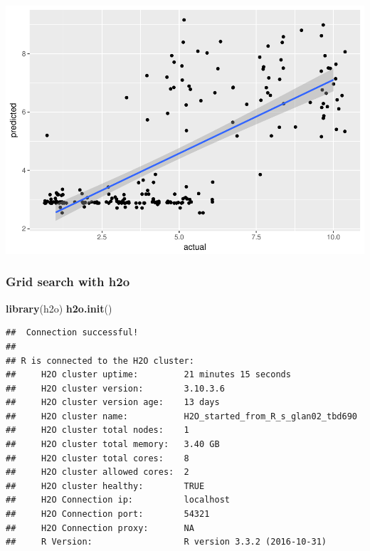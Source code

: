 \documentclass[]{article}
\newenvironment{Shaded}{\begin{snugshade}}{\end{snugshade}}
\newcommand{\KeywordTok}[1]{\textcolor[rgb]{0.13,0.29,0.53}{\textbf{{#1}}}}
\newcommand{\DataTypeTok}[1]{\textcolor[rgb]{0.13,0.29,0.53}{{#1}}}
\newcommand{\StringTok}[1]{\textcolor[rgb]{0.31,0.60,0.02}{{#1}}}
\newcommand{\NormalTok}[1]{{#1}}
\begin{document}
\begin{Shaded}
\end{Shaded}

\includegraphics{webinar_code_files/figure-latex/unnamed-chunk-21-1.pdf}

\subsubsection{Grid search with h2o}\label{grid-search-with-h2o}

\begin{Shaded}
\begin{Highlighting}[]
\KeywordTok{library}\NormalTok{(h2o)}
\KeywordTok{h2o.init}\NormalTok{()}
\end{Highlighting}
\end{Shaded}

\begin{verbatim}
##  Connection successful!
## 
## R is connected to the H2O cluster: 
##     H2O cluster uptime:         21 minutes 15 seconds 
##     H2O cluster version:        3.10.3.6 
##     H2O cluster version age:    13 days  
##     H2O cluster name:           H2O_started_from_R_s_glan02_tbd690 
##     H2O cluster total nodes:    1 
##     H2O cluster total memory:   3.40 GB 
##     H2O cluster total cores:    8 
##     H2O cluster allowed cores:  2 
##     H2O cluster healthy:        TRUE 
##     H2O Connection ip:          localhost 
##     H2O Connection port:        54321 
##     H2O Connection proxy:       NA 
##     R Version:                  R version 3.3.2 (2016-10-31)
\end{verbatim}
\end{document}
